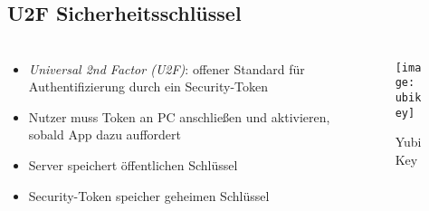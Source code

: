 \subsection{U2F Sicherheitsschlüssel}
\begin{frame}
    \frametitle{\currentsectionname}
    \begin{columns}
        \begin{column}{0.7\textwidth}
            \begin{itemize}
                \item \textit{Universal 2nd Factor (U2F)}:
                    offener Standard für Authentifizierung durch ein Security-Token
                \item Nutzer muss Token an PC anschließen und aktivieren,
                    sobald App dazu auffordert
                \item Server speichert öffentlichen Schlüssel
                \item Security-Token speicher geheimen Schlüssel
            \end{itemize}
        \end{column}
        \begin{column}{0.3\textwidth}
            \begin{figure}
                \texttt{[image: ubikey]}
                \caption{YubiKey}
            \end{figure}
        \end{column}
    \end{columns}

\end{frame}
